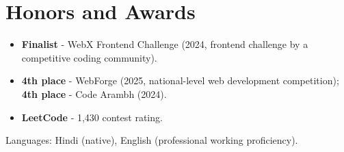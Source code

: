 \documentclass[11pt,a4paper,sans]{moderncv}
\begin{document}

\section{Honors and Awards}
\vspace{1pt}
\begin{itemize}
    \item {\textbf{Finalist} - WebX Frontend Challenge (2024, frontend challenge by a competitive coding community).}
    \item {\textbf{4th place} - WebForge (2025, national-level web development competition); \textbf{4th place} - Code Arambh (2024).}
    \item {\textbf{LeetCode} - 1,430 contest rating.}
\end{itemize}


\vspace{1pt}
\small{Languages: Hindi (native), English (professional working proficiency).}
\end{document}
